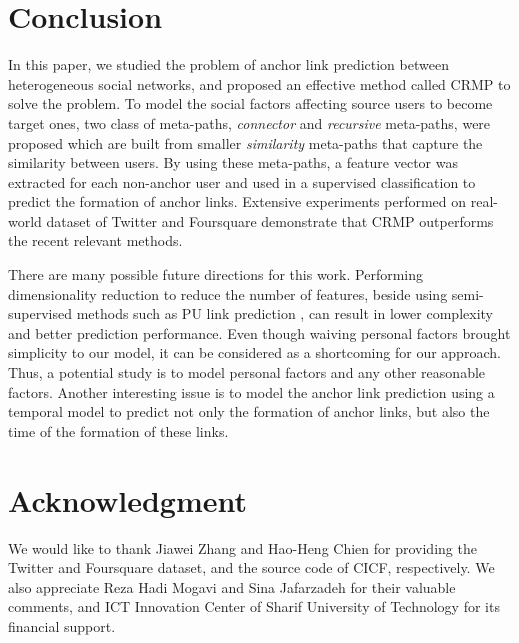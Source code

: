 \documentclass[conference]{IEEEtran}
\begin{document}
\section{Conclusion}\label{sec:conclusion}
In this paper, we studied the problem of anchor link prediction between heterogeneous social networks, and proposed an effective method called CRMP to solve the problem. To model the social factors affecting source users to become target ones, two class of meta-paths, \textit{connector} and \textit{recursive} meta-paths, were proposed which are built from smaller \textit{similarity} meta-paths that capture the similarity between users. By using these meta-paths, a feature vector was extracted for each non-anchor user and used in a supervised classification to predict the formation of anchor links. Extensive experiments performed on real-world dataset of Twitter and Foursquare demonstrate that CRMP outperforms the recent relevant methods.

There are many possible future directions for this work. Performing dimensionality reduction to reduce the number of features, beside using semi-supervised methods such as PU link prediction \cite{zhang2014meta}, can result in lower complexity and better prediction performance. Even though waiving personal factors brought simplicity to our model, it can be considered as a shortcoming for our approach. Thus, a potential study is to model personal factors and any other reasonable factors. Another interesting issue is to model the anchor link prediction using a temporal model to predict not only the formation of anchor links, but also the time of the formation of these links.


\section*{Acknowledgment}
We would like to thank Jiawei Zhang and Hao-Heng Chien for providing the Twitter and Foursquare dataset, and the source code of CICF, respectively. We also appreciate Reza Hadi Mogavi and Sina Jafarzadeh for their valuable comments, and ICT Innovation Center of Sharif University of Technology for its financial support.

\end{document}
